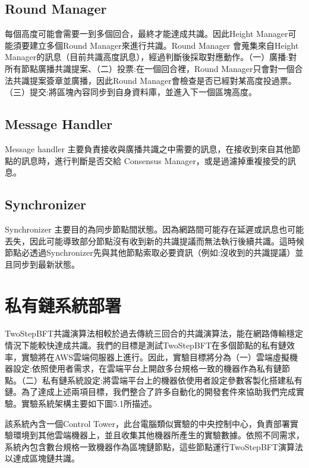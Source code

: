 \subsection{Round Manager}\label{se_5}
每個高度可能會需要一到多個回合，最終才能達成共識。因此Height Manager可能須要建立多個Round Manager來進行共識。Round Manager 會蒐集來自Height Manager的訊息（目前共識高度訊息），經過判斷後採取對應動作。（一）廣播:對所有節點廣播共識提案、（二）投票:在一個回合裡，Round Manager只會對一個合法共識提案簽章並廣播，因此Round Manager會檢查是否已經對某高度投過票。（三）提交:將區塊內容同步到自身資料庫，並進入下一個區塊高度。


\subsection{Message Handler}\label{se_5} 
Message handler 主要負責接收與廣播共識之中需要的訊息，在接收到來自其他節點的訊息時，進行判斷是否交給 Consensus Manager，或是過濾掉重複接受的訊息。

\subsection{Synchronizer}\label{se_5}
Synchronizer 主要目的為同步節點間狀態。因為網路間可能存在延遲或訊息也可能丟失，因此可能導致部分節點沒有收到新的共識提議而無法執行後續共識。這時候節點必透過Synchronizer先與其他節點索取必要資訊（例如:沒收到的共識提議）並且同步到最新狀態。  


\section{私有鏈系統部署}\label{se_5}  
TwoStepBFT共識演算法相較於過去傳統三回合的共識演算法，能在網路傳輸穩定情況下能較快達成共識。我們的目標是測試TwoStepBFT在多個節點的私有鏈效率，實驗將在AWS雲端伺服器上進行。因此，實驗目標將分為（一）雲端虛擬機器設定:依照使用者需求，在雲端平台上開啟多台規格一致的機器作為私有鏈節點。（二）私有鏈系統設定:將雲端平台上的機器依使用者設定參數客製化搭建私有鏈。為了達成上述兩項目標，我們整合了許多自動化的開發套件來協助我們完成實驗。實驗系統架構主要如下圖5.1所描述。

該系統內含一個Control Tower，此台電腦類似實驗的中央控制中心，負責部署實驗環境到其他雲端機器上，並且收集其他機器所產生的實驗數據。依照不同需求，系統內包含數台規格一致機器作為區塊鏈節點，這些節點運行TwoStepBFT演算法以達成區塊鏈共識。

